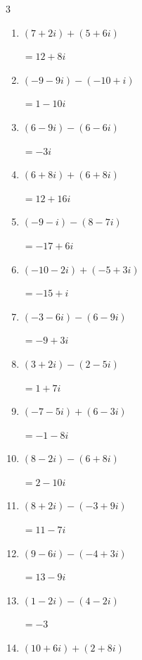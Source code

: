 \begin{multicols}{3}
\begin{enumerate}
  \item $\displaystyle (7+2i) + (5+6i)$

        $\displaystyle =12+8i$

  \item $\displaystyle (-9-9i) - (-10+i)$

        $\displaystyle =1-10i$

  \item $\displaystyle (6-9i) - (6-6i)$

        $\displaystyle =-3i$

  \item $\displaystyle (6+8i) + (6+8i)$

        $\displaystyle =12+16i$

  \item $\displaystyle (-9-i) - (8-7i)$

        $\displaystyle =-17+6i$

  \item $\displaystyle (-10-2i) + (-5+3i)$

        $\displaystyle =-15+i$

  \item $\displaystyle (-3-6i) - (6-9i)$

        $\displaystyle =-9+3i$

  \item $\displaystyle (3+2i) - (2-5i)$

        $\displaystyle =1+7i$

  \item $\displaystyle (-7-5i) + (6-3i)$

        $\displaystyle =-1-8i$

  \item $\displaystyle (8-2i) - (6+8i)$

        $\displaystyle =2-10i$

  \item $\displaystyle (8+2i) - (-3+9i)$

        $\displaystyle =11-7i$

\columnbreak %

  \item $\displaystyle (9-6i) - (-4+3i)$

        $\displaystyle =13-9i$

  \item $\displaystyle (1-2i) - (4-2i)$

        $\displaystyle =-3$

  \item $\displaystyle (10+6i) + (2+8i)$


\end{enumerate}
\end{multicols}

